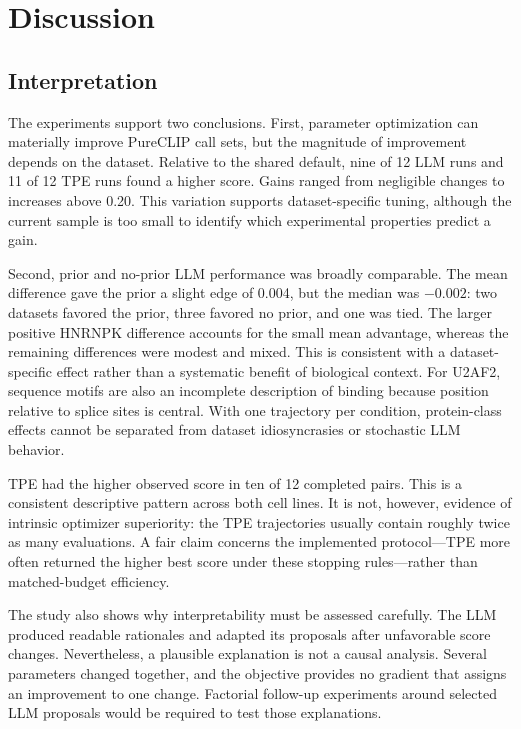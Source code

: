 \section{Discussion}
\label{discussion}

\subsection{Interpretation}

The experiments support two conclusions. First, parameter optimization can
materially improve PureCLIP call sets, but the magnitude of improvement depends
on the dataset. Relative to the shared default, nine of 12 LLM runs and 11 of 12
TPE runs found a higher score. Gains ranged from negligible
changes to increases above 0.20. This variation supports dataset-specific tuning,
although the current sample is too small to identify which experimental
properties predict a gain.

Second, prior and no-prior LLM performance was broadly comparable. The mean
difference gave the prior a slight edge of 0.004, but the median was $-0.002$:
two datasets favored the prior, three favored no prior, and one was tied. The
larger positive HNRNPK difference accounts for the small mean advantage, whereas
the remaining differences were modest and mixed. This is consistent with a
dataset-specific effect rather than a systematic benefit of biological context.
For U2AF2, sequence motifs are also an incomplete description of binding because
position relative to splice sites is central. With one trajectory per condition,
protein-class effects cannot be separated from dataset idiosyncrasies or
stochastic LLM behavior.

TPE had the higher observed score in ten of 12 completed pairs. This is a
consistent descriptive pattern across both cell lines. It is not, however,
evidence of intrinsic optimizer superiority:
the TPE trajectories usually contain roughly twice as many evaluations. A fair
claim concerns the implemented protocol---TPE more often returned the higher
best score under these stopping rules---rather than matched-budget efficiency.

The study also shows why interpretability must be assessed carefully. The LLM
produced readable rationales and adapted its proposals after unfavorable score
changes. Nevertheless, a plausible explanation is not a causal analysis. Several
parameters changed together, and the objective provides no gradient that assigns
an improvement to one change. Factorial follow-up experiments around selected
LLM proposals would be required to test those explanations.

